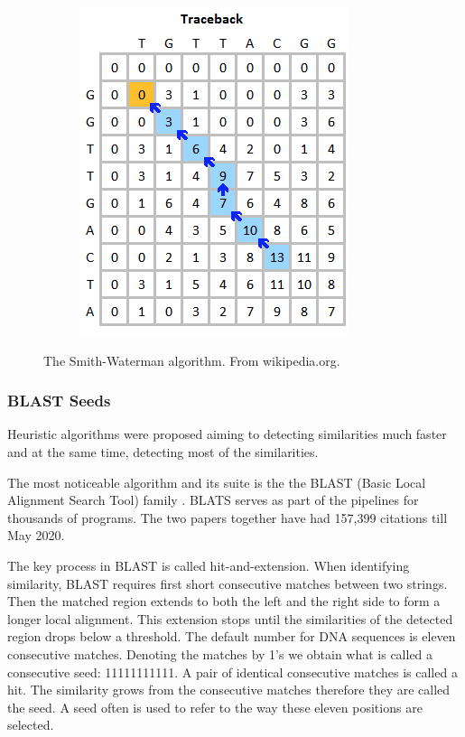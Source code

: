 \begin{figure}[h!]
\begin{subfigure}[b]{0.45\textwidth}
         \includegraphics[width=\textwidth]{img/Smith_waterman_backtra.png}
     \end{subfigure}
        \caption[The Smith-Waterman algorithm.]{The Smith-Waterman algorithm. From wikipedia.org.}
        \label{fig_smith_waterman}
\end{figure}

\subsubsection{BLAST Seeds}
Heuristic algorithms were proposed aiming to detecting similarities much faster and at the same time, detecting most of the similarities.

The most noticeable algorithm and its suite is the the BLAST (Basic Local Alignment Search Tool) family \cite{Altschul90_BLAST, altschul1997PSI_BLAST}. BLATS serves as part of the pipelines for thousands of programs. The two papers together have had 157,399 citations till May 2020. 

The key process in BLAST is called hit-and-extension. When identifying similarity, BLAST requires first short consecutive matches between two strings. Then the matched region extends to both the left and the right side to form a longer local alignment. This extension stops until the similarities of the detected region drops below a threshold. The default number for DNA sequences is eleven consecutive matches. Denoting the matches by 1's we obtain what is called a consecutive seed: 11111111111. A pair of identical consecutive matches is called a hit. The similarity grows from the consecutive matches therefore they are called the seed. A seed often is used to refer to the way these eleven positions are selected.

